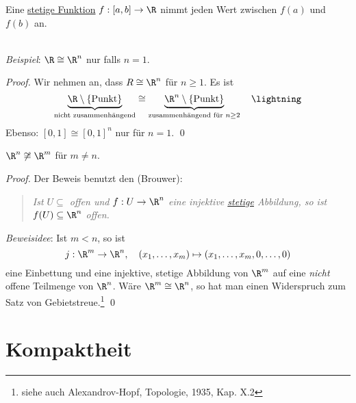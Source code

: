 \begin{corollary}[Zwischenwertsatz]
  Eine \hyperref[def:stetig]{stetige Funktion} \( f: [a,b] \to \R \) nimmt jeden Wert zwischen \( f(a) \) und \( f(b) \) an.
\end{corollary}

\begin{remark}
  \  \\ \emph{Beispiel}: \( \R \cong \R^n \) nur falls \( n = 1 \).
  \begin{proof}
    Wir nehmen an, dass \( R \cong \R^n \) für \( n \geq 1 \). Es ist
    \begin{equation*}
      \underbrace{\R \setminus \{ \text{Punkt} \}}_{\text{nicht zusammenhängend}} \cong \underbrace{\R^n \setminus \{ \text{Punkt} \} }_{\text{zusammenhängend für } n \geq 2} \quad \lightning
    \end{equation*}
    Ebenso: \( [0,1] \cong {[0,1]}^n \) nur für \( n = 1 \). \qed{}
  \end{proof}
\end{remark}

\begin{theorem}
  \( \R^n \not \cong \R^m \) für \( m \neq n \).
  \begin{proof}
    Der Beweis benutzt den \label{th:satzGebietstreue} (Brouwer):
    \begin{quote}
      \emph{Ist \( U \subseteq \) offen und \( f: U \to \R^n \) eine injektive \hyperref[def:stetig]{stetige} Abbildung, so ist \( f(U) \subseteq \R^n \) offen.}
    \end{quote}
    \emph{Beweisidee}: Ist \( m < n \), so ist
    \begin{equation*}
      j: \R^m \to \R^n, \quad (x_1, \dots, x_m) \mapsto (x_1, \dots, x_m, 0, \dots, 0)
    \end{equation*}
    eine Einbettung und eine injektive, stetige Abbildung von \( \R^m \) auf eine \emph{nicht} offene Teilmenge von \( \R^n \). Wäre \( \R^m \cong \R^n \), so hat man einen Widerspruch zum Satz von Gebietstreue.\footnote{siehe auch Alexandrov-Hopf, Topologie, 1935, Kap. X.2} \qed{}
  \end{proof}
\end{theorem}

\section{Kompaktheit}

